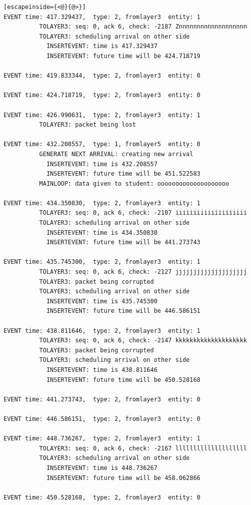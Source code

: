 \documentclass[paper=a4, fontsize=11pt]{scrartcl}
\numberwithin{equation}{section}		%
\numberwithin{figure}{section}			%
\numberwithin{table}{section}				%
\begin{document}
\begin{lstlisting}[escapeinside={<@}{@>}]
EVENT time: 417.329437,  type: 2, fromlayer3  entity: 1
          TOLAYER3: seq: 0, ack 6, check: -2187 Znnnnnnnnnnnnnnnnnnn
          TOLAYER3: scheduling arrival on other side
            INSERTEVENT: time is 417.329437
            INSERTEVENT: future time will be 424.718719

EVENT time: 419.833344,  type: 2, fromlayer3  entity: 0

EVENT time: 424.718719,  type: 2, fromlayer3  entity: 0

EVENT time: 426.990631,  type: 2, fromlayer3  entity: 1
          TOLAYER3: packet being lost

EVENT time: 432.208557,  type: 1, fromlayer5  entity: 0
          GENERATE NEXT ARRIVAL: creating new arrival
            INSERTEVENT: time is 432.208557
            INSERTEVENT: future time will be 451.522583
          MAINLOOP: data given to student: oooooooooooooooooooo

EVENT time: 434.350830,  type: 2, fromlayer3  entity: 1
          TOLAYER3: seq: 0, ack 6, check: -2107 iiiiiiiiiiiiiiiiiiii
          TOLAYER3: scheduling arrival on other side
            INSERTEVENT: time is 434.350830
            INSERTEVENT: future time will be 441.273743

EVENT time: 435.745300,  type: 2, fromlayer3  entity: 1
          TOLAYER3: seq: 0, ack 6, check: -2127 jjjjjjjjjjjjjjjjjjjj
          TOLAYER3: packet being corrupted
          TOLAYER3: scheduling arrival on other side
            INSERTEVENT: time is 435.745300
            INSERTEVENT: future time will be 446.586151

EVENT time: 438.811646,  type: 2, fromlayer3  entity: 1
          TOLAYER3: seq: 0, ack 6, check: -2147 kkkkkkkkkkkkkkkkkkkk
          TOLAYER3: packet being corrupted
          TOLAYER3: scheduling arrival on other side
            INSERTEVENT: time is 438.811646
            INSERTEVENT: future time will be 450.528168

EVENT time: 441.273743,  type: 2, fromlayer3  entity: 0

EVENT time: 446.586151,  type: 2, fromlayer3  entity: 0

EVENT time: 448.736267,  type: 2, fromlayer3  entity: 1
          TOLAYER3: seq: 0, ack 6, check: -2167 llllllllllllllllllll
          TOLAYER3: scheduling arrival on other side
            INSERTEVENT: time is 448.736267
            INSERTEVENT: future time will be 458.062866

EVENT time: 450.528168,  type: 2, fromlayer3  entity: 0


\end{lstlisting}
\end{document}
